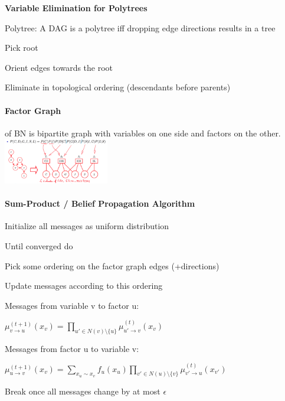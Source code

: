 \documentclass[a4paper, 10pt]{scrartcl}
\begin{document}
\begin{multicols*}{3}
\begin{compactitem}
	\end{compactitem}

		
	\textbf{Variable Elimination for Polytrees}
	
	Polytree: A DAG is a polytree iff dropping edge directions results in a tree
	\begin{compactitem}
		\item Pick root
		\item Orient edges towards the root
		\item Eliminate in topological ordering (descendants before parents)
	\end{compactitem}

	\paragraph{Factor Graph}
	of BN is bipartite graph with variables on one side and factors on the other.
	\includegraphics[height=2cm]{img/pai2.png}
	
	\paragraph{Sum-Product / Belief Propagation Algorithm}	
	
	\begin{compactitem}
		\item Initialize all messages as uniform distribution  
		\item Until converged do
		\begin{compactenum}
			\item Pick some ordering on the factor graph edges (+directions)   
			\item Update messages according to this ordering
			
			Messages from variable v to factor u: 
			
			$\mu^{(t+1)}_{v \rightarrow u}(x_v) = \prod_{u' \in N(v) \setminus \{u\}} \mu^{(t)}_{u' \rightarrow v}(x_{v})$ 
			
			Messages from factor u to variable v:
			
			$\mu^{(t+1)}_{u \rightarrow v}(x_v) = \sum_{x_u \sim x_v} f_u(x_u) \prod_{v' \in N(u) \setminus \{v\}} \mu^{(t)}_{v' \rightarrow u}(x_{v'})$ 

			\item Break once all messages change by at most $\epsilon$
		\end{compactenum}
	\end{compactitem}


\end{multicols*}
\end{document}
